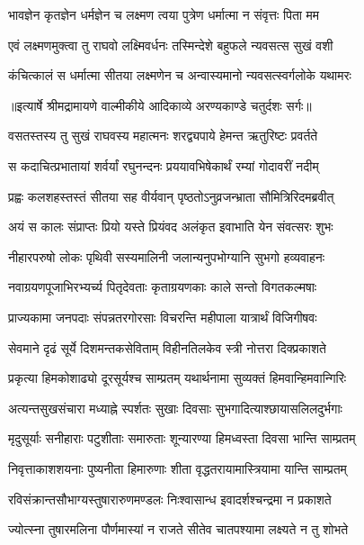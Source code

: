 \twolineshloka
{भावज्ञेन कृतज्ञेन धर्मज्ञेन च लक्ष्मण}
{त्वया पुत्रेण धर्मात्मा न संवृत्तः पिता मम} %

\twolineshloka
{एवं लक्ष्मणमुक्त्वा तु राघवो लक्ष्मिवर्धनः}
{तस्मिन्देशे बहुफले न्यवसत्स सुखं वशी} %

\twolineshloka
{कंचित्कालं स धर्मात्मा सीतया लक्ष्मणेन च}
{अन्वास्यमानो न्यवसत्स्वर्गलोके यथामरः} %


{॥इत्यार्षे श्रीमद्रामायणे वाल्मीकीये आदिकाव्ये अरण्यकाण्डे चतुर्दशः सर्गः॥}


\twolineshloka
{वसतस्तस्य तु सुखं राघवस्य महात्मनः}
{शरद्व्यपाये हेमन्त ऋतुरिष्टः प्रवर्तते} %

\twolineshloka
{स कदाचित्प्रभातायां शर्वर्यां रघुनन्दनः}
{प्रययावभिषेकार्थं रम्यां गोदावरीं नदीम्} %

\twolineshloka
{प्रह्वः कलशहस्तस्तं सीतया सह वीर्यवान्}
{पृष्ठतोऽनुव्रजन्भ्राता सौमित्रिरिदमब्रवीत्} %

\twolineshloka
{अयं स कालः संप्राप्तः प्रियो यस्ते प्रियंवद}
{अलंकृत इवाभाति येन संवत्सरः शुभः} %

\twolineshloka
{नीहारपरुषो लोकः पृथिवी सस्यमालिनी}
{जलान्यनुपभोग्यानि सुभगो हव्यवाहनः} %

\twolineshloka
{नवाग्रयणपूजाभिरभ्यर्च्य पितृदेवताः}
{कृताग्रयणकाः काले सन्तो विगतकल्मषाः} %

\twolineshloka
{प्राज्यकामा जनपदाः संपन्नतरगोरसाः}
{विचरन्ति महीपाला यात्रार्थं विजिगीषवः} %

\twolineshloka
{सेवमाने दृढं सूर्ये दिशमन्तकसेविताम्}
{विहीनतिलकेव स्त्री नोत्तरा दिक्प्रकाशते} %

\twolineshloka
{प्रकृत्या हिमकोशाढ्यो दूरसूर्यश्च साम्प्रतम्}
{यथार्थनामा सुव्यक्तं हिमवान्हिमवान्गिरिः} %

\twolineshloka
{अत्यन्तसुखसंचारा मध्याह्ने स्पर्शतः सुखाः}
{दिवसाः सुभगादित्याश्छायासलिलदुर्भगाः} %

\twolineshloka
{मृदुसूर्याः सनीहाराः पटुशीताः समारुताः}
{शून्यारण्या हिमध्वस्ता दिवसा भान्ति साम्प्रतम्} %

\twolineshloka
{निवृत्ताकाशशयनाः पुष्यनीता हिमारुणाः}
{शीता वृद्धतरायामास्त्रियामा यान्ति साम्प्रतम्} %

\twolineshloka
{रविसंक्रान्तसौभाग्यस्तुषारारुणमण्डलः}
{निःश्वासान्ध इवादर्शश्चन्द्रमा न प्रकाशते} %

\twolineshloka
{ज्योत्स्ना तुषारमलिना पौर्णमास्यां न राजते}
{सीतेव चातपश्यामा लक्ष्यते न तु शोभते} %


